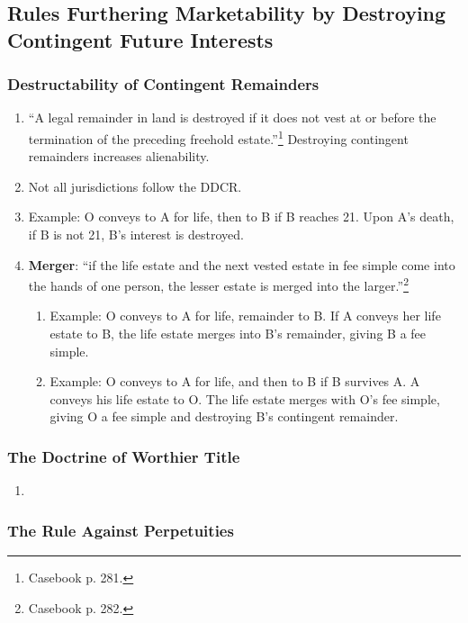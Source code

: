 \subsection{Rules Furthering Marketability by Destroying Contingent Future 
Interests}

\subsubsection{Destructability of Contingent Remainders}

\begin{enumerate}
    \item ``A legal remainder in land is destroyed if it does not vest at or 
    before the termination of the preceding freehold 
    estate.''\footnote{Casebook p. 281.} Destroying contingent remainders 
    increases alienability.
    \item Not all jurisdictions follow the DDCR.
    \item Example: O conveys to A for life, then to B if B reaches 21. Upon 
    A's death, if B is not 21, B's interest is destroyed.
    \item \textbf{Merger}: ``if the life estate and the next vested estate in 
    fee simple come into the hands of one person, the lesser estate is merged 
    into the larger.''\footnote{Casebook p. 282.}
    \begin{enumerate}
        \item Example: O conveys to A for life, remainder to B. If A conveys 
        her life estate to B, the life estate merges into B's remainder, 
        giving B a fee simple.
        \item Example: O conveys to A for life, and then to B if B survives A. 
        A conveys his life estate to O. The life estate merges with O's fee 
        simple, giving O a fee simple and destroying B's contingent remainder.
    \end{enumerate}
\end{enumerate}

\subsubsection{The Doctrine of Worthier Title}

\begin{enumerate}
    \item %
\end{enumerate}

\subsubsection{The Rule Against Perpetuities}
